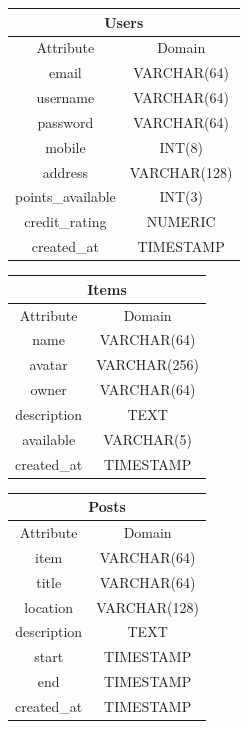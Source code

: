 \begin{center}
\begin{tabular}{|c|c|}
\multicolumn{2}{c}{Users}\\[2mm]
\hline
Attribute & Domain\\
\hline
email & VARCHAR(64)\\
username & VARCHAR(64) \\
password & VARCHAR(64) \\
mobile & INT(8) \\
address & VARCHAR(128) \\
points\_available & INT(3) \\
credit\_rating & NUMERIC \\
created\_at & TIMESTAMP \\
\hline
\end{tabular}
\end{center}



\begin{center}
\begin{tabular}{|c|c|}
\multicolumn{2}{c}{Items}\\[2mm]
\hline
Attribute & Domain\\
\hline
name & VARCHAR(64)\\
avatar & VARCHAR(256) \\
owner & VARCHAR(64) \\
description & TEXT \\
available & VARCHAR(5)\\
created\_at & TIMESTAMP \\
\hline
\end{tabular}
\end{center}

\begin{center}
\begin{tabular}{|c|c|}
\multicolumn{2}{c}{Posts}\\[2mm]
\hline
Attribute & Domain\\
\hline
item & VARCHAR(64)\\
title & VARCHAR(64) \\
location & VARCHAR(128) \\
description & TEXT \\
start & TIMESTAMP \\
end & TIMESTAMP \\
created\_at & TIMESTAMP \\
\hline
\end{tabular}
\end{center}

